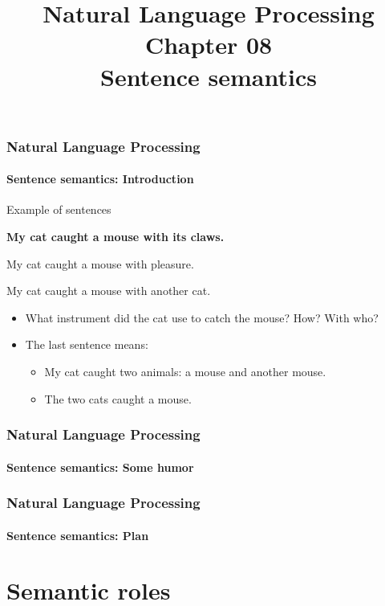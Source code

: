 \documentclass[xcolor=table]{beamer}
\title[ESI - NLP: 08- Sentence semantics]%
{Natural Language Processing\\Chapter 08\\Sentence semantics}
\begin{document}
	
\begin{frame}
\frametitle{Natural Language Processing}
\framesubtitle{Sentence semantics: Introduction}

\begin{exampleblock}{Example of sentences}
	\begin{center}
		\Large\bfseries
		My cat caught a mouse with its claws.
		
		My cat caught a mouse with pleasure.
		
		My cat caught a mouse with another cat.
	\end{center}
\end{exampleblock}

\begin{itemize}
	\item What instrument did the cat use to catch the mouse? How? With who?
	\item The last sentence means: 
	\begin{itemize}
		\item My cat caught two animals: a mouse and another mouse.
		\item The two cats caught a mouse.
	\end{itemize}
\end{itemize}

\end{frame}

\begin{frame}
	\frametitle{Natural Language Processing}
	\framesubtitle{Sentence semantics: Some humor}
	
	\begin{center}
	\end{center}
	
\end{frame}

\begin{frame}
\frametitle{Natural Language Processing}
\framesubtitle{Sentence semantics: Plan}

\begin{multicols}{2}
\tableofcontents
\end{multicols}
\end{frame}

\section{Semantic roles}
\end{document}
